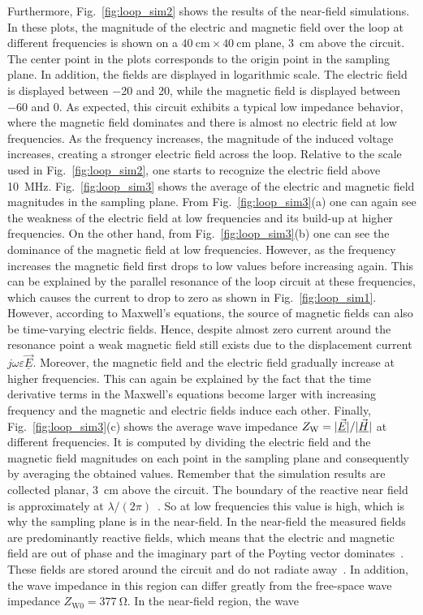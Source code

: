 Furthermore, Fig.~\ref{fig:loop_sim2} shows the results of the near-field simulations. In these plots, the magnitude of the electric and magnetic field over the loop at different frequencies is shown on a $\SI{40}{\centi\meter} \times \SI{40}{\centi\meter}$ plane, \SI{3}{\centi\meter} above the circuit. The center point in the plots corresponds to the origin point in the sampling plane. In addition, the fields are displayed in logarithmic scale. The electric field is displayed between \SI{-20}{\dBVpm} and \SI{20}{\dBVpm}, while the magnetic field is displayed between \SI{-60}{\dBApm} and \SI{0}{\dBApm}. As expected, this circuit exhibits a typical low impedance behavior, where the magnetic field dominates and there is almost no electric field at low frequencies. As the frequency increases, the magnitude of the induced voltage increases, creating a stronger electric field across the loop. Relative to the scale used in Fig.~\ref{fig:loop_sim2}, one starts to recognize the electric field above \SI{10}{\mega\hertz}. Fig.~\ref{fig:loop_sim3} shows the average of the electric and magnetic field magnitudes in the sampling plane. From Fig.~\ref{fig:loop_sim3}(a) one can again see the weakness of the electric field at low frequencies and its build-up at higher frequencies. On the other hand, from Fig.~\ref{fig:loop_sim3}(b) one can see the dominance of the magnetic field at low frequencies. However, as the frequency increases the magnetic field first drops to low values before increasing again. This can be explained by the parallel resonance of the loop circuit at these frequencies, which causes the current to drop to zero as shown in Fig.~\ref{fig:loop_sim1}. However, according to Maxwell's equations, the source of magnetic fields can also be time-varying electric fields. Hence, despite almost zero current around the resonance point a weak magnetic field still exists due to the displacement current $j\omega\varepsilon\underline{\vec{E}}$. Moreover, the magnetic field and the electric field gradually increase at higher frequencies. This can again be explained by the fact that the time derivative terms in the Maxwell's equations become larger with increasing frequency and the magnetic and electric fields induce each other. Finally, Fig.~\ref{fig:loop_sim3}(c) shows the average wave impedance $Z_\mathrm{W} = \lvert\underline{\vec{E}}\rvert/\lvert\underline{\vec{H}}\rvert$ at different frequencies. It is computed by dividing the electric field and the magnetic field magnitudes on each point in the sampling plane and consequently by averaging the obtained values. Remember that the simulation results are collected planar, \SI{3}{\centi\meter} above the circuit. The boundary of the reactive near field is approximately at $\lambda/(2\pi)$~\cite{balanis}. So at low frequencies this value is high, which is why the sampling plane is in the near-field. In the near-field the measured fields are predominantly reactive fields, which means that the electric and magnetic field are out of phase and the imaginary part of the Poyting vector dominates~\cite{balanis}. These fields are stored around the circuit and do not radiate away~\cite{balanis}. In addition, the wave impedance in this region can differ greatly from the free-space wave impedance $Z_\mathrm{W0} = \SI{377}{\ohm}$. In the near-field region, the wave 